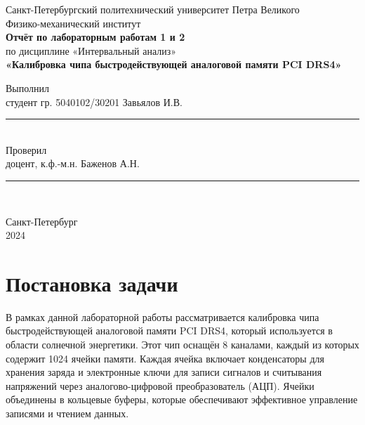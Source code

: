 \documentclass[a4paper,14pt]{extarticle}
\begin{document}
\begin{titlepage}
    \begin{center}
        Санкт-Петербургский политехнический университет Петра Великого\\
        Физико-механический институт\\[4cm]
        
        \textbf{Отчёт по лабораторным работам 1 и 2}\\[0.5cm]
        по дисциплине «Интервальный анализ»\\[0.5cm]
        \textbf{«Калибровка чипа быстродействующей аналоговой памяти PCI DRS4»}\\[4cm]

        
        \begin{flushleft}
            Выполнил\\
            студент гр. 5040102/30201 \hfill Завьялов И.В. \hfill \rule{3cm}{0.1pt} \\[1.5cm]
            Проверил\\
            доцент, к.ф.-м.н. \hfill \hspace{1.9cm} Баженов А.Н. \hfill \rule{3cm}{0.1pt} \\[1.5cm]
        \end{flushleft}
        
        \vfill
        Санкт-Петербург\\
        2024
    \end{center}
\end{titlepage}

\newpage

\tableofcontents

\newpage
\section{Постановка задачи}

В рамках данной лабораторной работы рассматривается калибровка чипа быстродействующей аналоговой памяти PCI DRS4, который используется в области солнечной энергетики. Этот чип оснащён 8 каналами, каждый из которых содержит 1024 ячейки памяти. Каждая ячейка включает конденсаторы для хранения заряда и электронные ключи для записи сигналов и считывания напряжений через аналогово-цифровой преобразователь (АЦП). Ячейки объединены в кольцевые буферы, которые обеспечивают эффективное управление записями и чтением данных.
\end{document}
